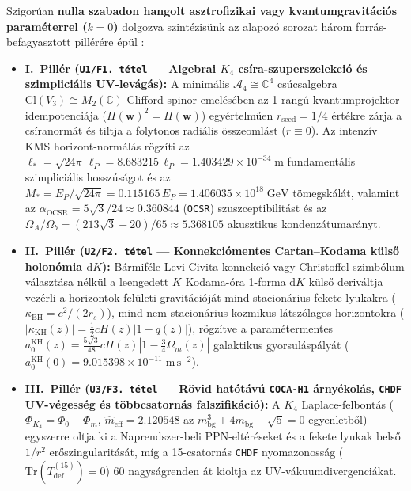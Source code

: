 \documentclass[11pt,a4paper]{article}
\theoremstyle{remark}
\begin{document}
Szigor\'uan \textbf{nulla szabadon hangolt asztrofizikai vagy kvantumgravit\'aci\'os param\'eterrel ($k = 0$)} dolgozva szint\'ezis\"unk az alapoz\'o sorozat h\'arom forr\'as-befagyasztott pill\'er\'ere \'ep\"ul \cite{JolcsakTauFoundationSeries2026}:
\begin{itemize}
  \item \textbf{I.\ Pill\'er (\texttt{U1/F1.\ t\'etel} --- Algebrai $K_4$ cs\'ira-szuperszelekci\'o \'es szimplici\'alis UV-lev\'ag\'as):} A minim\'alis $\mathcal{A}_4 \cong \mathbb{C}^4$ cs\'ucsalgebra $\mathrm{Cl}(V_3) \cong M_2(\mathbb{C})$ Clifford-spinor emel\'es\'eben az 1-rang\'u kvantumprojektor idempotenci\'aja ($\Pi(\mathbf{w})^2 = \Pi(\mathbf{w})$) egy\'ertelm\H{u}en $r_{\mathrm{seed}} = 1/4$ \'ert\'ekre z\'arja a cs\'iranorm\'at \'es tiltja a folytonos radi\'alis \"osszeoml\'ast ($\dot{r} \equiv 0$). Az intenz\'iv KMS horizont-norm\'al\'as r\"ogz\'iti az $\ell_* = \sqrt{24\pi}\,\ell_P = 8.683215\,\ell_P = 1.403429 \times 10^{-34}\;\mathrm{m}$ fundament\'alis szimplici\'alis hossz\'us\'agot \'es az $M_* = E_P/\sqrt{24\pi} = 0.115165\,E_P = 1.406035 \times 10^{18}\;\mathrm{GeV}$ t\"omegsk\'al\'at, valamint az $\alpha_{\mathrm{OCSR}} = 5\sqrt{3}/24 \approx 0.360844$ (\texttt{OCSR}) szuszceptibilit\'ast \'es az $\Omega_A/\Omega_b = (213\sqrt{3}-20)/65 \approx 5.368105$ akusztikus kondenz\'atumar\'anyt.
  \item \textbf{II.\ Pill\'er (\texttt{U2/F2.\ t\'etel} --- Konnekci\'omentes Cartan--Kodama k\"uls\H{o} holon\'omia $\mathrm{d}K$):} B\'armif\'ele Levi-Civita-konnekci\'o vagy Christoffel-szimb\'olum v\'alaszt\'asa n\'elk\"ul a leengedett $K$ Kodama-\'ora 1-forma $\mathrm{d}K$ k\"uls\H{o} deriv\'altja vez\'erli a horizontok fel\"uleti gravit\'aci\'oj\'at mind stacion\'arius fekete lyukakra ($\kappa_{\mathrm{BH}} = c^2/(2r_s)$), mind nem-stacion\'arius kozmikus l\'atsz\'olagos horizontokra ($|\kappa_{\mathrm{KH}}(z)| = \frac{1}{2}cH(z)|1 - q(z)|$), r\"ogz\'itve a param\'etermentes $a_0^{\mathrm{KH}}(z) = \frac{5\sqrt{3}}{48}cH(z)|1 - \frac{3}{4}\Omega_m(z)|$ galaktikus gyorsul\'asp\'aly\'at ($a_0^{\mathrm{KH}}(0) = 9.015398 \times 10^{-11}\;\mathrm{m\,s^{-2}}$).
  \item \textbf{III.\ Pill\'er (\texttt{U3/F3.\ t\'etel} --- R\"ovid hat\'ot\'av\'u \texttt{COCA-H1} \'arny\'ekol\'as, \texttt{CHDF} UV-v\'egess\'eg \'es t\"obbcsatorn\'as falszifik\'aci\'o):} A $K_4$ Laplace-felbont\'as ($\Phi_{K_4} = \Phi_0 - \Phi_m$, $\hat{m}_{\mathrm{eff}} = 2.120548$ az $m_{\mathrm{bg}}^3 + 4m_{\mathrm{bg}} - \sqrt{5} = 0$ egyenletb\H{o}l) egyszerre oltja ki a Naprendszer-beli PPN-elt\'er\'eseket \'es a fekete lyukak bels\H{o} $1/r^2$ er\H{o}szingularit\'as\'at, m\'ig a 15-csatorn\'as \texttt{CHDF} nyomazonoss\'ag ($\mathrm{Tr}(T_{\mathrm{def}}^{(15)}) = 0$) 60 nagys\'agrenden \'at kioltja az UV-v\'akuumdivergenci\'akat.
\end{itemize}
\end{document}

